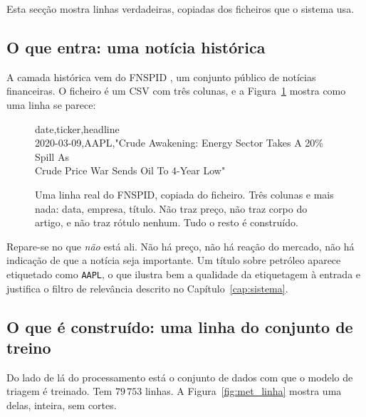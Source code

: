 Esta secção mostra linhas verdadeiras, copiadas dos ficheiros que o sistema usa.

\subsection{O que entra: uma notícia histórica}

A camada histórica vem do \gls{FNSPID} \autocite{dong2024fnspid}, um conjunto público de notícias
financeiras. O ficheiro é um \gls{CSV} com três colunas, e a Figura~\ref{fig:met_fnspid} mostra como
uma linha se parece:

\begin{figure}[ht]
\centering
\begin{tcolorbox}[colback=black!3, colframe=black!30, boxrule=0.4pt, arc=2pt,
                  width=0.96\textwidth, fontupper=\ttfamily\footnotesize]
date,ticker,headline\\
2020-03-09,AAPL,"Crude Awakening: Energy Sector Takes A 20\% Spill As\\
\hspace*{2em}Crude Price War Sends Oil To 4-Year Low"
\end{tcolorbox}
\caption[Uma linha do conjunto de dados histórico]{Uma linha real do \gls{FNSPID}, copiada do
ficheiro. Três colunas e mais nada: data, empresa, título. Não traz preço, não traz corpo do
artigo, e não traz rótulo nenhum. Tudo o resto é construído.}
\label{fig:met_fnspid}
\end{figure}

Repare-se no que \emph{não} está ali. Não há preço, não há reação do mercado, não há indicação de
que a notícia seja importante. Um título sobre petróleo aparece etiquetado como \texttt{AAPL},
o que ilustra bem a qualidade da etiquetagem à entrada e justifica o filtro de relevância descrito
no Capítulo~\ref{cap:sistema}.

\subsection{O que é construído: uma linha do conjunto de treino}

Do lado de lá do processamento está o conjunto de dados com que o modelo de triagem é treinado.
Tem $79\,753$ linhas. A Figura~\ref{fig:met_linha} mostra uma delas, inteira, sem cortes.

